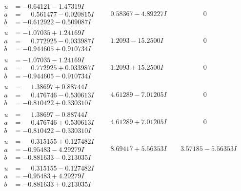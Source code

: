 \documentclass[1p]{elsarticle_modified}
\theoremstyle{definition}
\begin{document}
$$\begin{array}{c|c|c}
\begin{aligned}
u &= -0.64121 - 1.47319 I \\
a &= \phantom{-}0.561477 - 0.020815 I \\
b &= -0.612922 - 0.509087 I\end{aligned}
 & \phantom{-}0.58367 - 4.89227 I & \phantom{-0.000000 } 0 \\ \hline\begin{aligned}
u &= -1.07035 + 1.24169 I \\
a &= \phantom{-}0.772925 - 0.033987 I \\
b &= -0.944605 + 0.910734 I\end{aligned}
 & \phantom{-}1.2093 - 15.2500 I & \phantom{-0.000000 } 0 \\ \hline\begin{aligned}
u &= -1.07035 - 1.24169 I \\
a &= \phantom{-}0.772925 + 0.033987 I \\
b &= -0.944605 - 0.910734 I\end{aligned}
 & \phantom{-}1.2093 + 15.2500 I & \phantom{-0.000000 } 0 \\ \hline\begin{aligned}
u &= \phantom{-}1.38697 + 0.88744 I \\
a &= \phantom{-}0.476746 - 0.530613 I \\
b &= -0.810422 + 0.330310 I\end{aligned}
 & \phantom{-}4.61289 - 7.01205 I & \phantom{-0.000000 } 0 \\ \hline\begin{aligned}
u &= \phantom{-}1.38697 - 0.88744 I \\
a &= \phantom{-}0.476746 + 0.530613 I \\
b &= -0.810422 - 0.330310 I\end{aligned}
 & \phantom{-}4.61289 + 7.01205 I & \phantom{-0.000000 } 0 \\ \hline\begin{aligned}
u &= \phantom{-}0.315155 + 0.127482 I \\
a &= -0.95483 - 4.29279 I \\
b &= -0.881633 - 0.213035 I\end{aligned}
 & \phantom{-}8.69417 + 5.56353 I & \phantom{-}3.57185 - 5.56353 I \\ \hline\begin{aligned}
u &= \phantom{-}0.315155 - 0.127482 I \\
a &= -0.95483 + 4.29279 I \\
b &= -0.881633 + 0.213035 I\end{aligned}

\end{array}$$
\end{document}
